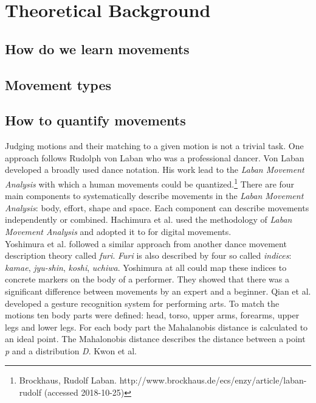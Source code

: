 \chapter{Theoretical Background}

\section{How do we learn movements}

\section{Movement types}

\section{How to quantify movements}
Judging motions and their matching to a given motion is not a trivial task. One approach follows Rudolph von Laban who was a professional dancer. Von Laban developed a broadly used dance notation. His work lead to the \textit{Laban Movement Analysis} with which a human movements could be quantized.\footnote{Brockhaus, Rudolf Laban. http://www.brockhaus.de/ecs/enzy/article/laban-rudolf (accessed 2018-10-25)} There are four main components to systematically describe movements in the \textit{Laban Movement Analysis}: body, effort, shape and space. Each component can describe movements independently or combined. Hachimura et al. \todo used the methodology  of \textit{Laban Movement Analysis} and adopted it to for digital movements.\\
Yoshimura et al. \todo followed a similar approach from another dance movement description theory called \textit{furi}. \textit{Furi} is also described by four so called \textit{indices}: \textit{kamae}, \textit{jyu-shin}, \textit{koshi}, \textit{uchiwa}. Yoshimura at all could map these indices to concrete markers on the body of a performer. They showed that there was a significant difference between movements by an expert and a beginner. Qian et al. \todo developed a gesture recognition system for performing arts. To match the motions ten body parts were defined: head, torso, upper arms, forearms, upper legs and lower legs. For each body part the Mahalanobis distance is calculated to an ideal point. The Mahalonobis distance describes the distance between a point \textit{p} and a distribution \textit{D}. Kwon et al. \todo 
